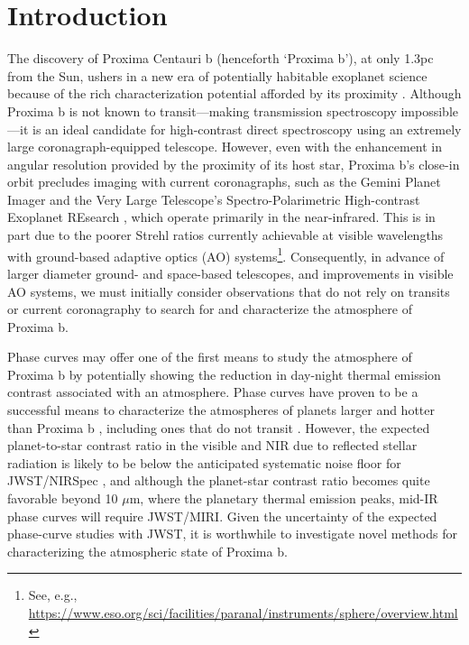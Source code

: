 \documentclass[apjl]{emulateapj}
\begin{document}


\section{Introduction\label{sec:intro}}

The discovery of Proxima Centauri b (henceforth `Proxima b'), at only 1.3pc from the Sun, ushers in a new era of potentially habitable exoplanet science because of the rich characterization potential afforded by its proximity \citep{Anglada-Escude2016}.  Although Proxima b is not known to transit---making transmission spectroscopy impossible---it is an ideal candidate for high-contrast direct spectroscopy using an extremely large coronagraph-equipped telescope. However, even with the enhancement in angular resolution provided by the proximity of its host star, Proxima b's close-in orbit \citep[$a = 0.0485$ AU;][]{Anglada-Escude2016} precludes imaging with current coronagraphs, such as the Gemini Planet Imager \citep[GPI;][]{Macintosh2014} and the Very Large Telescope's Spectro-Polarimetric High-contrast Exoplanet REsearch \citep[VLT-SPHERE;][]{Beuzit2008}, which operate primarily in the near-infrared. This is in part due to the poorer Strehl ratios currently achievable at visible wavelengths with ground-based adaptive optics (AO) systems\footnote{See, e.g., \url{https://www.eso.org/sci/facilities/paranal/instruments/sphere/overview.html}}. Consequently, in advance of larger diameter ground- and space-based telescopes, and improvements in visible AO systems, we must initially consider observations that do not rely on transits or current coronagraphy to search for and characterize the atmosphere of Proxima b.

Phase curves may offer one of the first means to study the atmosphere of Proxima b \citep{Turbet2016,Kreidberg2016,Meadows2016} by potentially showing the reduction in day-night thermal emission contrast associated with an atmosphere. Phase curves have proven to be a successful means to characterize the atmospheres of planets larger and hotter than Proxima b \citep{Cowan2007, Knutson2007, Knutson2008, Crossfield2010, Brogi2012, Zellem2014, Stevenson2014}, including ones that do not transit \citep{Selsis2011, Faigler2011, Maurin2012, Brogi2014}. However, the expected planet-to-star contrast ratio in the visible and NIR due to reflected stellar radiation is likely to be below the anticipated systematic noise floor for JWST/NIRSpec \citep{Meadows2016}, and although the planet-star contrast ratio becomes quite favorable beyond 10 $\mu$m, where the planetary thermal emission peaks, mid-IR phase curves will require JWST/MIRI. Given the uncertainty of the expected phase-curve studies with JWST, it is worthwhile to investigate novel methods for characterizing the atmospheric state of Proxima b. 
\end{document}
